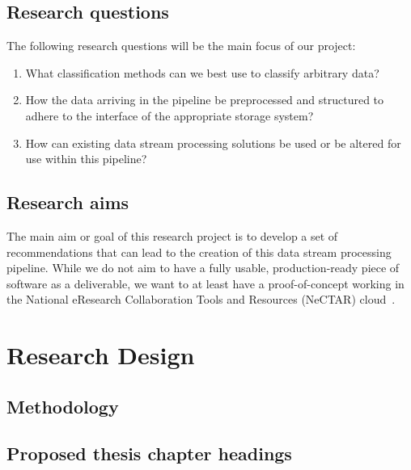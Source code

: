 \documentclass[a4paper,11pt]{article}
\begin{document}
\subsection{Research questions} %
\label{sub:research_questions}

The following research questions will be the main focus of our project:

\begin{enumerate}
  \item What classification methods can we best use to classify arbitrary data?
  \item How the data arriving in the pipeline be preprocessed and structured to adhere to the interface of the appropriate
   storage system?
  \item How can existing data stream processing solutions be used or be altered for use within this pipeline?
\end{enumerate}



\subsection{Research aims} %
\label{sub:research_aims}

The main aim or goal of this research project is to develop a set of recommendations that can lead to the creation of
this data stream processing pipeline. While we do not aim to have a fully usable, production-ready piece of software as a
deliverable, we want to at least have a proof-of-concept working in the National eResearch Collaboration Tools and Resources
(NeCTAR) cloud~\cite{web:Nectar}.





\section{Research Design} %
\label{sec:research_design}

\subsection{Methodology} %
\label{sub:methodology}




\subsection{Proposed thesis chapter headings} %
\label{sub:proposed_thesis_chapter_headings}
\end{document}
